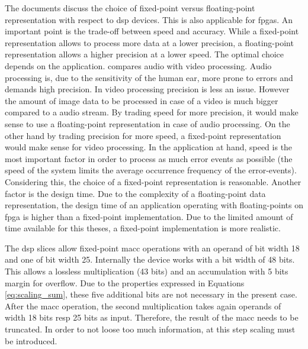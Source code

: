\documentclass[mscthesis]{usiinfthesis}
\begin{document}
The documents \cite{smith97, ti04} discuss the choice of fixed-point versus
floating-point representation with respect to \gls{dsp} devices. This is also
applicable for \glspl{fpga}. An important point is the trade-off between speed
and accuracy. While a fixed-point representation allows to process more data at
a lower precision, a floating-point representation allows a higher precision at
a lower speed. The optimal choice depends on the application. \cite{ti04}
compares audio with video processing. Audio processing is, due to the
sensitivity of the human ear, more prone to errors and demands high precision.
In video processing precision is less an issue. However the amount of image
data to be processed in case of a video is much bigger compared to a audio
stream. By trading speed for more precision, it would make sense to use
a floating-point representation in case of audio processing. On the other hand
by trading precision for more speed, a fixed-point representation would make
sense for video processing. In the application at hand, speed is the most
important factor in order to process as much error events as possible (the
speed of the system limits the average occurrence frequency of the
error-events). Considering this, the choice of a fixed-point representation is
reasonable. Another factor is the design time. Due to the complexity of
a floating-point data representation, the design time of an application
operating with floating-points on \gls{fpga} is higher than a fixed-point
implementation. Due to the limited amount of time available for this theses,
a fixed-point implementation is more realistic.

The \gls{dsp} slices allow fixed-point \gls{macc} operations with an operand of
bit width 18 and one of bit width 25. Internally the device works with a bit
width of 48 bits. This allows a lossless multiplication (43 bits) and an
accumulation with 5 bits margin for overflow. Due to the properties expressed
in Equations \ref{eq:scaling_sum}, these five additional bits are not necessary
in the present case. After the \gls{macc} operation, the second multiplication
takes again operands of width 18 bits resp 25 bits as input. Therefore, the
result of the \gls{macc} needs to be truncated. In order to not loose too much
information, at this step scaling must be introduced.
\end{document}
